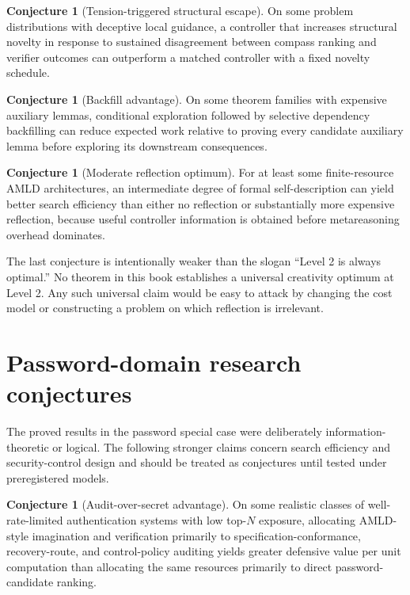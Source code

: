\documentclass[11pt,openany]{book}
\theoremstyle{definition}
\newtheorem{conjecture}[theorem]{Conjecture}
\theoremstyle{remark}
\begin{document}
\begin{conjecture}[Tension-triggered structural escape]\label{conj:tension}
On some problem distributions with deceptive local guidance, a controller that increases structural novelty in response to sustained disagreement between compass ranking and verifier outcomes can outperform a matched controller with a fixed novelty schedule.
\end{conjecture}

\begin{conjecture}[Backfill advantage]\label{conj:backfill}
On some theorem families with expensive auxiliary lemmas, conditional exploration followed by selective dependency backfilling can reduce expected work relative to proving every candidate auxiliary lemma before exploring its downstream consequences.
\end{conjecture}

\begin{conjecture}[Moderate reflection optimum]\label{conj:lev2}
For at least some finite-resource AMLD architectures, an intermediate degree of formal self-description can yield better search efficiency than either no reflection or substantially more expensive reflection, because useful controller information is obtained before metareasoning overhead dominates.
\end{conjecture}

The last conjecture is intentionally weaker than the slogan ``Level 2 is always optimal.'' No theorem in this book establishes a universal creativity optimum at Level 2. Any such universal claim would be easy to attack by changing the cost model or constructing a problem on which reflection is irrelevant.



\section{Password-domain research conjectures}
The proved results in the password special case were deliberately information-theoretic or logical. The following stronger claims concern search efficiency and security-control design and should be treated as conjectures until tested under preregistered models.

\begin{conjecture}[Audit-over-secret advantage]\label{conj:auditsecret}
On some realistic classes of well-rate-limited authentication systems with low top-$N$ exposure, allocating AMLD-style imagination and verification primarily to specification-conformance, recovery-route, and control-policy auditing yields greater defensive value per unit computation than allocating the same resources primarily to direct password-candidate ranking.
\end{conjecture}
\end{document}
